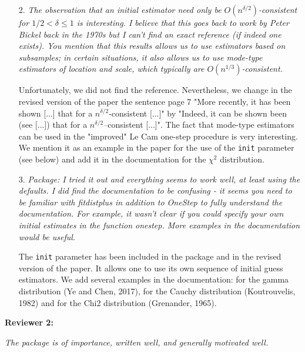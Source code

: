 \documentclass[11pt, a4paper]{article}
\begin{document}
\begin{enumerate}
\begin{enumerate}
\end{enumerate}

\item[2.] {\it The observation that an initial estimator need only be $O(n^{\delta/2})$-consistent for $1/2 < \delta \leq 1$ is interesting. I believe that this goes back to work by Peter Bickel back in the 1970s but I can’t find an exact reference (if indeed one exists). You mention that this results allows us to use estimators based on subsamples; in certain situations, it also allows us to use mode-type estimators of location and scale, which typically are $O(n^{1/3})$-consistent.}

Unfortunately, we did not find the reference. Nevertheless, we change in the revised version of the paper the sentence page 7 "More recently, it has been shown [...] that for a $n^{\delta/2}$-consistent [...]" by "Indeed, it can be shown been (see [...]) that for a $n^{\delta/2}$--consistent [...]". 
The fact that mode-type estimators can be used in the "improved" Le Cam one-step procedure is very interesting.  We mention it as an example in the paper for the use of the \texttt{init} parameter (see below) and add it in the documentation for the $\chi^2$ distribution.

\item[3.] {\it Package:  I tried it out and everything seems to work well, at least using the defaults.  I did find the documentation to be confusing - it seems you need to be familiar with fitdistplus in addition to OneStep to fully understand the documentation. For example, it wasn’t clear if you could specify your own initial estimates in the function onestep. More examples in the documentation would be useful.}

The \texttt{init} parameter has been included in the package and in the revised version of the paper. It allows one to use its own sequence of initial guess estimators. We add several examples in the documentation: for the gamma distribution (Ye and Chen, 2017), for the Cauchy distribution (Koutrouvelis, 1982) and for the Chi2 distribution (Grenander, 1965).

\end{enumerate}


{\bf Reviewer 2:}

{\it The package is of importance, written well, and generally motivated
well.}
\end{document}
